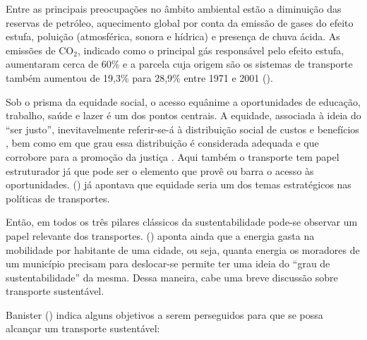 Entre as principais preocupações no âmbito ambiental estão a diminuição das reservas de petróleo, aquecimento global por conta da emissão de gases do efeito estufa, poluição (atmosférica, sonora e hídrica) e presença de chuva ácida. As emissões de CO$_2$, indicado como o principal gás responsável pelo efeito estufa, aumentaram cerca de 60\% e a parcela cuja origem são os sistemas de transporte também aumentou de 19,3\% para 28,9\% entre 1971 e 2001 (\cite{BANISTER2005}).

Sob o prisma da equidade social, o acesso equânime a oportunidades de educação, trabalho, saúde e lazer é um dos pontos centrais. A equidade, associada à ideia do ``ser justo'', inevitavelmente referir-se-á à distribuição social de custos e benefícios , bem como em que grau essa distribuição é considerada adequada e que corrobore para a promoção da justiça \cite{LITMAN2006}. Aqui também o transporte tem papel estruturador já que pode ser o elemento que provê ou barra o acesso às oportunidades. (\citeyear{SANCHEZ2003}) já apontava que equidade seria um dos temas estratégicos nas políticas de transportes.

Então, em todos os três pilares clássicos da sustentabilidade pode-se observar um papel relevante dos transportes. (\citeyear{VASCONCELLOS2012}) aponta ainda que a energia gasta na mobilidade por habitante de uma cidade, ou seja, quanta energia os moradores de um município precisam para deslocar-se permite ter uma ideia do ``grau de sustentabilidade'' da mesma. Dessa maneira, cabe uma breve discussão sobre transporte sustentável.

Banister (\citeyear{BANISTER2005,BANISTER2008}) indica alguns objetivos a serem perseguidos para que se possa alcançar um transporte sustentável:

